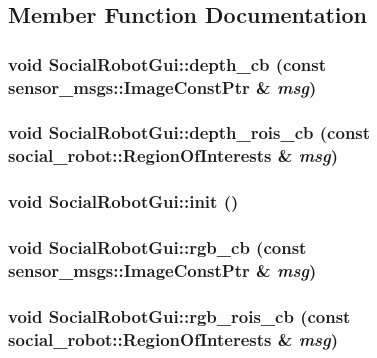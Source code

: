 \subsection{Member Function Documentation}
\hypertarget{classSocialRobotGui_a20bf403e17980a1c2d9f3efaf99a0ddd}{
\subsubsection[{depth\_\-cb}]{\setlength{\rightskip}{0pt plus 5cm}void SocialRobotGui::depth\_\-cb (const sensor\_\-msgs::ImageConstPtr \& {\em msg})}}
\label{classSocialRobotGui_a20bf403e17980a1c2d9f3efaf99a0ddd}
\hypertarget{classSocialRobotGui_a0c36cf4cb20fec7ec4d79abeb04b140d}{
\subsubsection[{depth\_\-rois\_\-cb}]{\setlength{\rightskip}{0pt plus 5cm}void SocialRobotGui::depth\_\-rois\_\-cb (const {\bf social\_\-robot::RegionOfInterests} \& {\em msg})}}
\label{classSocialRobotGui_a0c36cf4cb20fec7ec4d79abeb04b140d}
\hypertarget{classSocialRobotGui_a3a979f567341925976347b3c1b735347}{
\subsubsection[{init}]{\setlength{\rightskip}{0pt plus 5cm}void SocialRobotGui::init ()}}
\label{classSocialRobotGui_a3a979f567341925976347b3c1b735347}
\hypertarget{classSocialRobotGui_adeb531e38774a69cf8411aa18d2af8e2}{
\subsubsection[{rgb\_\-cb}]{\setlength{\rightskip}{0pt plus 5cm}void SocialRobotGui::rgb\_\-cb (const sensor\_\-msgs::ImageConstPtr \& {\em msg})}}
\label{classSocialRobotGui_adeb531e38774a69cf8411aa18d2af8e2}
\hypertarget{classSocialRobotGui_aac3a124449c975e2bc69fbc71d891e16}{
\subsubsection[{rgb\_\-rois\_\-cb}]{\setlength{\rightskip}{0pt plus 5cm}void SocialRobotGui::rgb\_\-rois\_\-cb (const {\bf social\_\-robot::RegionOfInterests} \& {\em msg})}}
